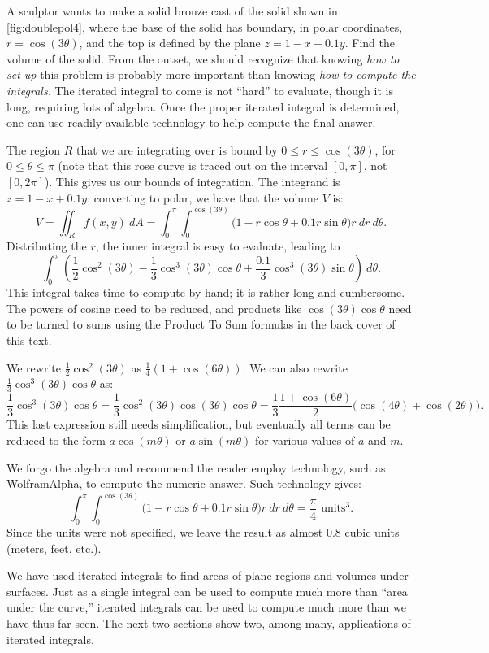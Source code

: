 \begin{example}\label{ex_doublepol4}
A sculptor wants to make a solid bronze cast of the solid shown in \autoref{fig:doublepol4}, where the base of the solid has boundary, in polar coordinates, $r=\cos(3\theta)$, and the top is defined by the plane $z=1-x+0.1y$. Find the volume of the solid.
\solution
From the outset, we should recognize that knowing \textit{how to set up} this problem is probably more important than knowing \textit{how to compute the integrals.} The iterated integral to come is not ``hard'' to evaluate, though it is long, requiring lots of algebra. Once the proper iterated integral is determined, one can use readily-available technology to help compute the final answer. 

The region $R$ that we are integrating over is bound by $0\leq r\leq \cos(3\theta)$, for $0\leq \theta\leq\pi$ (note that this rose curve is traced out on the interval $[0,\pi]$, not $[0,2\pi]$). This gives us our bounds of integration. The integrand is $z=1-x+0.1y$; converting to polar, we have that the volume $V$ is:
\[V = \iint_R f(x,y)\ dA = \int_0^\pi\int_0^{\cos(3\theta)}\big(1-r\cos\theta+0.1r\sin\theta\big)r\ dr\ d\theta.\]
Distributing the $r$, the inner integral is easy to evaluate, leading to 
\[ \int_0^\pi \left(\frac12\cos^2(3\theta)-\frac13\cos^3(3\theta)\cos\theta
+\frac{0.1}3\cos^3(3\theta)\sin\theta\right)\ d\theta.\]
This integral takes time to compute by hand; it is rather long and cumbersome. The powers of cosine need to be reduced, and products like $\cos(3\theta)\cos\theta$ need to be turned to sums using the Product To Sum formulas in the back cover of this text. 

We rewrite $\frac12\cos^2(3\theta)$ as $\frac14(1+\cos(6\theta))$. We can also rewrite $\frac13\cos^3(3\theta)\cos\theta$ as: 
\[\frac13\cos^3(3\theta)\cos\theta = \frac13\cos^2(3\theta)\cos(3\theta)\cos\theta = \frac13\frac{1+\cos(6\theta)}2\big(\cos(4\theta)+\cos(2\theta)\big).\]
This last expression still needs simplification, but eventually all terms can be reduced to the form $a\cos(m\theta)$ or $a\sin(m\theta)$ for various values of $a$ and $m$.

We forgo the algebra and recommend the reader employ technology, such as WolframAlpha\textregistered, to compute the numeric answer. Such technology gives:
\[\int_0^\pi\int_0^{\cos(3\theta)}\big(1-r\cos\theta+0.1r\sin\theta\big)r\ dr\ d\theta = \frac{\pi}{4} %
\text{ units}^3.\]
Since the units were not specified, we leave the result as almost $0.8$ cubic units (meters, feet, etc.).%
\end{example}

We have used iterated integrals to find areas of plane regions and volumes under surfaces. Just as a single integral can be used to compute much more than ``area under the curve,'' iterated integrals can be used to compute much more than we have thus far seen. The next two sections show two, among many, applications of iterated integrals.

